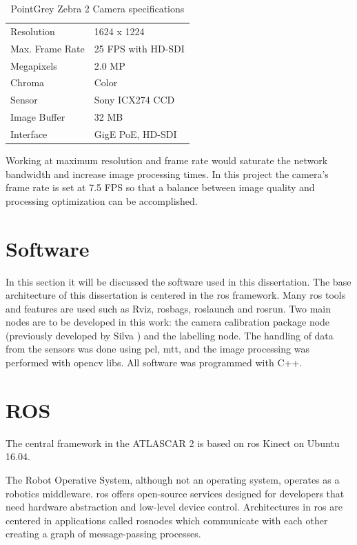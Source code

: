 \begin{table}[!h]
	\centering
	\caption{PointGrey Zebra 2 Camera specifications}
	\label{tab: pointgreyspecs}
	\begin{tabular}{ll}
		
		\hline
		Resolution & 1624 x 1224\\
		Max. Frame Rate & 25 FPS with HD-SDI \\
		Megapixels & 2.0 MP \\
		Chroma & Color\\
		Sensor & Sony ICX274 CCD \\
		Image Buffer &	32 MB\\
		Interface &	GigE PoE, HD-SDI\\
		
		\hline
	\end{tabular}
\end{table}

Working at maximum resolution and frame rate would saturate the network bandwidth and increase image processing times. In this project the camera's frame rate is set at 7.5 FPS so that a balance between image quality and processing optimization can be accomplished.


\section{Software}

In this section it will be discussed the software used in this dissertation. The base architecture of this dissertation is centered in the \gls{ros} framework. Many \gls{ros} tools and features are used such as Rviz, rosbags, roslaunch and rosrun. Two main nodes are to be developed in this work: the camera calibration package node (previously developed by Silva \cite{VieiradaSilva2016}) and the labelling node. The handling of data from the sensors was done using \gls{pcl}, \gls{mtt}, 
and the image processing was performed with \gls{opencv} libs. All software was programmed with C++.

\section{ROS}
The central framework in the ATLASCAR 2 is based on \gls{ros} Kinect on Ubuntu 16.04.

The Robot Operative System, although not an operating system, operates as a robotics middleware. \gls{ros} offers open-source services designed for developers that need hardware abstraction and low-level device control. Architectures in \gls{ros} are centered in applications called rosnodes which communicate with each other creating a graph of  message-passing processes. 

